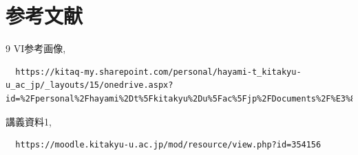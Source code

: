 \documentclass[a4paper,titlepage,11pt]{ltjsarticle}
\begin{document}
  \section{参考文献}
\begin{thebibliography}{9}
VI参考画像,
\begin{verbatim}
  https://kitaq-my.sharepoint.com/personal/hayami-t_kitakyu-u_ac_jp/_layouts/15/onedrive.aspx?id=%2Fpersonal%2Fhayami%2Dt%5Fkitakyu%2Du%5Fac%5Fjp%2FDocuments%2F%E3%82%B7%E3%82%B9%E3%83%86%E3%83%A0%E9%96%8B%E7%99%BA%E5%85%A5%E9%96%802022&ga=1
\end{verbatim}
講義資料1,
\begin{verbatim}
  https://moodle.kitakyu-u.ac.jp/mod/resource/view.php?id=354156
\end{verbatim}
\end{thebibliography}
\end{document}
